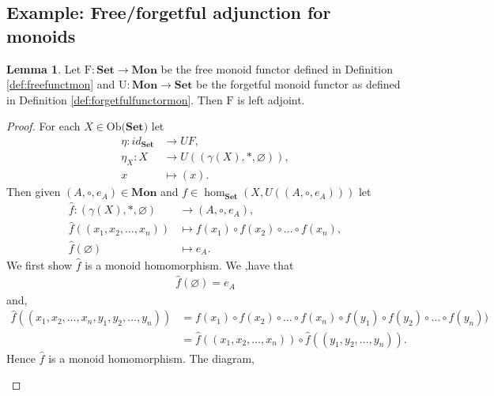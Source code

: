 \documentclass[11pt,a4paper]{article}
\theoremstyle{definition}
\newtheorem{lemma}[thm]{Lemma}
\newcommand\ho[3][]{\hom_{#1}(#2,#3)}
\newcommand\ob[1]{\mathrm{Ob(}#1\mathrm{)}}
\numberwithin{equation}{section}
\begin{document}
\subsection{Example: Free/forgetful adjunction for monoids}
\label{ss:freeforgetadjunction} 
\begin{lemma}
    \label{lem:freeadj}
    Let $\mathrm{F}\colon\mathbf{Set}\to\mathbf{Mon}$ be the free monoid functor defined in Definition \ref{def:freefunctmon} and $\mathrm{U}\colon\mathbf{Mon}\to\mathbf{Set}$ be the forgetful monoid functor as defined in Definition \ref{def:forgetfulfunctormon}. Then $\mathrm{F}$ is left adjoint.
\end{lemma}
\begin{proof}
    For each $X\in\ob{\mathbf{Set}}$ let \begin{align*}
    \eta\colon id_{\mathbf{Set}}&\to UF,\\
    \eta_{X}\colon X&\to U((\gamma(X),*,\varnothing)),\\
    x&\mapsto (x).
\end{align*}
Then given $(A,\circ,e_{A})\in\mathbf{Mon}$ and $f\in\ho[\mathbf{Set}]{X}{U((A,\circ,e_{A}))}$ let \begin{align*}
    \hat{f}\colon(\gamma(X),*,\varnothing)&\to(A,\circ,e_{A}),\\
    \hat{f}((x_{1},x_{2},\dots,x_{n}))&\mapsto f(x_{1})\circ f(x_{2})\circ\dots\circ f(x_{n}),\\
    \hat{f}(\varnothing)&\mapsto e_{A}.
\end{align*}
We first show $\hat{f}$ is a monoid homomorphism. We ,have that
\begin{align*}
    \hat{f}(\varnothing) = e_{A}
\end{align*}
and,
\begin{align*}
    \hat{f}((x_{1},x_{2},\dots,x_{n},y_{1},y_{2},\dots,y_{n})) &= f(x_{1})\circ f(x_{2})\circ \dots\circ f(x_{n})\circ f(y_{1})\circ f(y_{2})\circ\dots\circ f(y_{n}))\\
    &= \hat{f}((x_{1},x_{2},\dots,x_{n}))\circ\hat{f}((y_{1},y_{2},\dots,y_{n})).
\end{align*}
Hence $\hat{f}$ is a monoid homomorphism.
The diagram,
\begin{center}
\end{center}
\end{proof}
\end{document}
